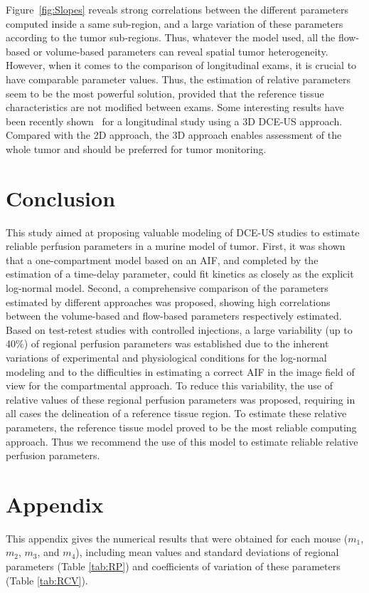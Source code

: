  Figure~\ref{fig:Slopes} reveals strong correlations between the different parameters computed inside a same sub-region, and a large variation of these parameters according to the tumor sub-regions. Thus, whatever the model used,  all the flow-based or volume-based parameters can reveal spatial tumor heterogeneity. However, when it comes to the comparison of longitudinal exams, it is crucial to have comparable parameter values. Thus, the estimation of relative parameters seem to be the most powerful solution, provided that the reference tissue characteristics are not modified between exams.
Some interesting results have been recently shown~\cite{Wang2015bb} for a longitudinal study using a 3D DCE-US approach. Compared with the 2D approach, the 3D approach enables assessment of the whole tumor and should be preferred for tumor monitoring.

 \section{Conclusion}
This study aimed at proposing valuable modeling of DCE-US studies to estimate reliable perfusion parameters in a murine model of tumor. First, it was shown that a one-compartment model based on an AIF, and completed by the estimation of a time-delay parameter, could fit kinetics as closely as the explicit log-normal model. Second, a comprehensive comparison of the parameters estimated by different approaches was proposed, showing high correlations between the volume-based  and flow-based parameters respectively estimated. Based on test-retest studies with controlled injections, a large variability (up to 40\%) of regional perfusion parameters was established due to the inherent variations of experimental and physiological conditions for the log-normal modeling and to the difficulties in estimating a correct AIF in the image field of view for the compartmental approach. To reduce this variability, the use of relative values of these regional perfusion parameters was proposed, requiring in all cases the delineation of a reference tissue region. To estimate these relative parameters, the reference tissue model proved to be the most reliable computing approach. Thus we recommend the use of this model to estimate reliable relative perfusion parameters.

\section* {Appendix}
This appendix gives the numerical results that were obtained for each mouse ($m_1$, $m_2$, $m_3$, and $m_4$), including mean values and standard deviations of regional parameters (Table \ref{tab:RP}) and coefficients of variation of these parameters (Table \ref{tab:RCV}). 

